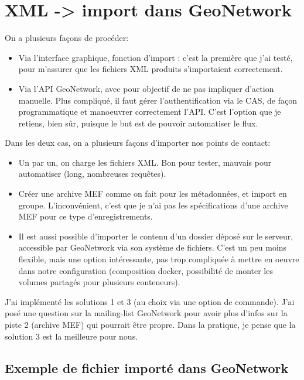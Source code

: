 \documentclass[11pt, a4paper, oneside]{book}
\newcommand{\gn}{GeoNetwork\xspace}
\begin{document}
\section*{XML -> import dans \gn}
On a plusieurs façons de procéder:
\begin{itemize}
	\item Via l'interface graphique, fonction d'import : c'est la première que j'ai testé, pour m'assurer que les fichiers XML produits s'importaient correctement.
	\item Via l'API \gn, avec pour objectif de ne pas impliquer d'action manuelle. Plus compliqué, il faut gérer l'authentification via le CAS, de façon programmatique et manoeuvrer correctement l'API. C'est l'option que je retiens, bien sûr, puisque le but est de pouvoir automatiser le flux.
\end{itemize}
\vspace{0.5cm}

Dans les deux cas, on a plusieurs façons d'importer nos points de contact:
\begin{itemize}
	\item Un par un, on charge les fichiers XML. Bon pour tester, mauvais pour automatiser (long, nombreuses requêtes).
	\item Créer une archive MEF comme on fait pour les métadonnées, et import en groupe. L'inconvénient, c'est que je n'ai pas les spécifications d'une archive MEF pour ce type d'enregistrements.
	\item Il est aussi possible d'importer le contenu d'un dossier déposé sur le serveur, accessible par \gn via son système de fichiers. C'est un peu moins flexible, mais une option intéressante, pas trop compliquée à mettre en oeuvre dans notre configuration (composition docker, possibilité de monter les volumes partagés pour plusieurs conteneurs).
\end{itemize}

\vspace{0.5cm}
J'ai implémenté les solutions 1 et 3 (au choix via une option de commande). J'ai posé une question sur la mailing-list \gn pour avoir plus d'infos sur la piste 2 (archive MEF) qui pourrait être propre. Dans la pratique, je pense que la solution 3 est la meilleure pour nous.

\subsection*{Exemple de fichier importé dans \gn}

\end{document}
